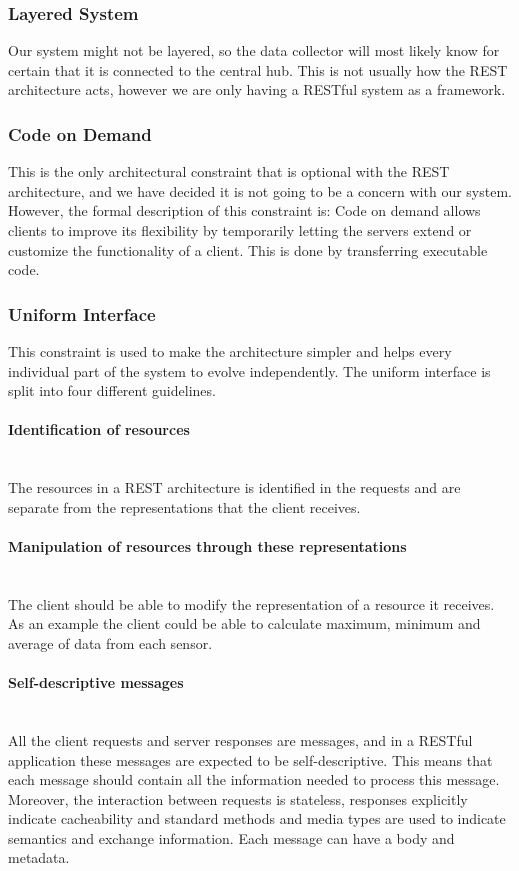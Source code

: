 \documentclass[../document.tex]{subfiles}
\begin{document}
\subsubsection{Layered System}
Our system might not be layered, so the data collector will most likely know for certain that it is connected to the central hub. This is not usually how the REST architecture acts, however we are only having a RESTful system as a framework. 

\subsubsection{Code on Demand}
This is the only architectural constraint that is optional with the REST architecture, and we have decided it is not going to be a concern with our system. However, the formal description of this constraint is: Code on demand allows clients to improve its flexibility by temporarily letting the servers extend or customize the functionality of a client. This is done by transferring executable code.

\subsubsection{Uniform Interface}
This constraint is used to make the architecture simpler and helps every individual part of the system to evolve independently. The uniform interface is split into four different guidelines.

\paragraph{Identification of resources} \ \\
The resources in a REST architecture is identified in the requests and are separate from the representations that the client receives. 

\paragraph{Manipulation of resources through these representations} \ \\
The client should be able to modify the representation of a resource it receives. As an example the client could be able to calculate maximum, minimum and average of data from each sensor. 

\paragraph{Self-descriptive messages} \ \\
All the client requests and server responses are messages, and in a RESTful application these messages are expected to be self-descriptive. This means that each message should contain all the information needed to process this message. Moreover, the interaction between requests is stateless, responses explicitly indicate cacheability and standard methods and media types are used to indicate semantics and exchange information. Each message can have a body and metadata.
\end{document}
